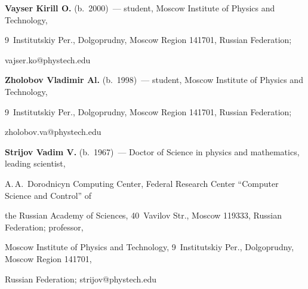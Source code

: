 \textbf{Vayser Kirill O.} (b.\ 2000)~--- student, Moscow Institute of Physics and Technology, 


9~Institutskiy Per., Dolgoprudny, Moscow Region 141701, Russian Federation; 


\mbox{vajser.ko@phystech.edu}





\vspace*{5pt}





\noindent


\textbf{Zholobov Vladimir Al.} (b.\ 1998)~--- student, Moscow Institute of Physics and Technology, 


9~Institutskiy Per., Dolgoprudny, Moscow Region 141701, Russian Federation; 


\mbox{zholobov.va@phystech.edu}





\vspace*{5pt}





\noindent


\textbf{Strijov Vadim V.} (b.\ 1967)~--- Doctor of Science in physics and mathematics, leading scientist, 


A.\,A.~Dorodnicyn Computing Center, Federal Research Center ``Computer Science and Control'' of 


the Russian Academy of Sciences, 40~Vavilov Str., Moscow 119333, Russian Federation; professor, 


Moscow Institute of Physics and Technology, 9~Institutskiy Per., Dolgoprudny, Moscow Region 141701, 


Russian Federation; \mbox{strijov@phystech.edu}\





\label{end\stat}





\renewcommand{\bibname}{\protect\rm Литература} 


      


